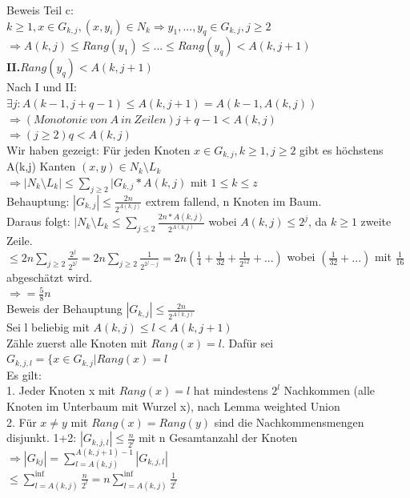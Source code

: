 \documentclass[a4paper]{article}
\begin{document}
Beweis Teil c:\\
$k\geq 1, x\in G_{k,j},(x,y_i)\in N_k \Rightarrow y_1,...,y_q \in G_{k,j}, j\geq 2$\\
$\Rightarrow A(k,j) \leq Rang(y_1)\leq ...\leq Rang(y_q)<A(k,j+1)$\\
\textbf{II.}$Rang(y_q)<A(k,j+1)$\\
Nach I und II:\\
$\exists j: A(k-1,j+q-1)\leq A(k,j+1) = A(k-1,A(k,j))$\\
$\Rightarrow (Monotonie\ von\ A\ in\ Zeilen) j+q-1 < A(k,j)$\\
$\Rightarrow (j\geq 2) q < A(k,j)$\\
Wir haben gezeigt: Für jeden Knoten $x\in G_{k,j},k\geq 1,j\geq 2$ gibt es höchstens A(k,j) Kanten $(x,y)\in N_k\setminus L_k$\\
$\Rightarrow |N_k\setminus L_k | \leq \sum_{j\geq 2} |G_{k,j} * A(k,j)$ mit $1\leq k \leq z$\\
Behauptung: $|G_{k,j} | \leq \frac{2n}{2^{A(k,j)}}$ extrem fallend, n Knoten im Baum.\\
Daraus folgt: $|N_k\setminus L_k \leq \sum_{j\leq 2} \frac{2n*A(k,j)}{2^{A(k,j)}}$ wobei $A(k,j) \leq 2^j$, da $k\geq 1$ zweite Zeile.\\
$\leq 2n\sum_{j\geq 2} \frac{2^j}{2^{2^j}} = 2n\sum_{j\geq 2} \frac{1}{2^{2^j-j}} = 2n(\frac{1}{4} + \frac{1}{32}+\frac{1}{2^{12}}+...)$ wobei $(\frac{1}{32}+...)$ mit $\frac{1}{16}$ abgeschätzt wird.\\
$\Rightarrow = \frac{5}{8}n$\\
Beweis der Behauptung $|G_{k,j} | \leq \frac{2n}{2^{A(k,j)}}$\\
Sei l beliebig mit $A(k,j) \leq l < A(k,j+1)$\\
Zähle zuerst alle Knoten mit $Rang(x)=l$. Dafür sei $G_{k,j,l} = \lbrace x\in G_{k,j} | Rang(x) = l$\\
Es gilt:\\
1. Jeder Knoten x mit $Rang(x)=l$ hat mindestens $2^l$ Nachkommen (alle Knoten im Unterbaum mit Wurzel x), nach Lemma weighted Union\\
2. Für $x\neq y$ mit $Rang(x)=Rang(y)$ sind die Nachkommensmengen disjunkt.
1+2: $|G_{k,j,l}| \leq \frac{n}{2^l}$ mit n Gesamtanzahl der Knoten\\
$\Rightarrow |G_{kj}| = \sum_{l=A(k,j)}^{A(k,j+1)-1} | G_{k,j,l}|$\\
$\leq \sum_{l=A(k,j)}^{\inf} \frac{n}{2^l} = n\sum_{l=A(k,j)}^{\inf} \frac{1}{2^l}$\\
\end{document}
